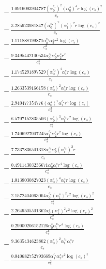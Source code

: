 \documentclass[10pt]{article}
\begin{document}
\begin{align*}
&{}  - \frac{1.0916093904787 \left(\alpha_{0}^{c_s}\right)^{2} \left(\alpha_{0}^s\right)^{4} r \log{\left(c_{s} \right)}^{2}}{c_{s}} \\
&{}  - \frac{3.285923981847 \left(\alpha_{0}^{c_s}\right)^{2} \left(\alpha_{1}^s\right)^{2} r \log{\left(c_{s} \right)}^{2}}{c_{s}} \\
&{}  - \frac{1.111888199871 \alpha_{0}^{c_s} \alpha_{3}^s r^{2} \log{\left(c_{s} \right)}}{c_{s}^{2}} \\
&{}  - \frac{9.3495442100534 \alpha_{0}^{c_s} \alpha_{0}^s \alpha_{2}^s r^{2}}{c_{s}^{2}} \\
&{}  - \frac{1.1745291897529 \left(\alpha_{0}^{c_s}\right)^{4} \alpha_{1}^s r \log{\left(c_{s} \right)}}{c_{s}} \\
&{}  - \frac{1.2633539166158 \left(\alpha_{0}^s\right)^{2} \alpha_{3}^s r \log{\left(c_{s} \right)}}{c_{s}} \\
&{}  - \frac{2.940477354776 \left(\alpha_{0}^s\right)^{2} \alpha_{1}^{c_s} r^{3} \log{\left(c_{s} \right)}}{c_{s}^{3}} \\
&{}  - \frac{6.5707152835506 \left(\alpha_{0}^s\right)^{3} \alpha_{1}^{c_s} r^{2} \log{\left(c_{s} \right)}}{c_{s}^{2}} \\
&{}  - \frac{1.7406927007245 \alpha_{1}^{c_s} \alpha_{2}^s r^{2} \log{\left(c_{s} \right)}}{c_{s}^{2}} \\
&{}  - \frac{7.7337836501318 \alpha_{0}^{c_s} \alpha_{0}^s \left(\alpha_{1}^{c_s}\right)^{2} r}{c_{s}} \\
&{}  - \frac{0.49114303236671 \alpha_{0}^s \alpha_{1}^s r^{4} \log{\left(c_{s} \right)}}{c_{s}^{4}} \\
&{}  - \frac{1.0138030827023 \left(\alpha_{0}^s\right)^{4} \alpha_{1}^s r \log{\left(c_{s} \right)}}{c_{s}} \\
&{}  - \frac{2.1572404063004 \alpha_{0}^{c_s} \left(\alpha_{1}^s\right)^{2} r^{2} \log{\left(c_{s} \right)}^{2}}{c_{s}^{2}} \\
&{}  - \frac{2.2649505501362 \alpha_{0}^s \left(\alpha_{1}^s\right)^{2} r^{2} \log{\left(c_{s} \right)}^{2}}{c_{s}^{2}} \\
&{}  - \frac{0.29000206152126 \alpha_{0}^s \alpha_{1}^{c_s} r^{4} \log{\left(c_{s} \right)}}{c_{s}^{4}} \\
&{}  - \frac{9.3635434623802 \left(\alpha_{0}^s\right)^{2} \alpha_{1}^{c_s} \alpha_{1}^s r}{c_{s}} \\
&{}  - \frac{0.040682752793669 \alpha_{1}^{c_s} \alpha_{2}^s r^{2} \log{\left(c_{s} \right)}^{3}}{c_{s}^{2}} \\

\end{align*}
\end{document}

